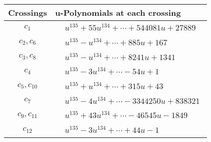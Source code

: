 \documentclass[1p]{elsarticle_modified}
\theoremstyle{definition}
\begin{document}
\begin{tabular}{m{50pt}|m{274pt}}
Crossings & \hspace{64pt}u-Polynomials at each crossing \\
\hline $$\begin{aligned}c_{1}\end{aligned}$$&$\begin{aligned}
&u^{135}+55 u^{134}+\cdots+544081 u+27889
\end{aligned}$\\
\hline $$\begin{aligned}c_{2},c_{6}\end{aligned}$$&$\begin{aligned}
&u^{135}- u^{134}+\cdots+885 u+167
\end{aligned}$\\
\hline $$\begin{aligned}c_{3},c_{8}\end{aligned}$$&$\begin{aligned}
&u^{135}- u^{134}+\cdots+8241 u+1341
\end{aligned}$\\
\hline $$\begin{aligned}c_{4}\end{aligned}$$&$\begin{aligned}
&u^{135}-3 u^{134}+\cdots-54 u+1
\end{aligned}$\\
\hline $$\begin{aligned}c_{5},c_{10}\end{aligned}$$&$\begin{aligned}
&u^{135}+u^{134}+\cdots+315 u+43
\end{aligned}$\\
\hline $$\begin{aligned}c_{7}\end{aligned}$$&$\begin{aligned}
&u^{135}-4 u^{134}+\cdots-3344250 u+838321
\end{aligned}$\\
\hline $$\begin{aligned}c_{9},c_{11}\end{aligned}$$&$\begin{aligned}
&u^{135}+43 u^{134}+\cdots-46545 u-1849
\end{aligned}$\\
\hline $$\begin{aligned}c_{12}\end{aligned}$$&$\begin{aligned}
&u^{135}-3 u^{134}+\cdots+44 u-1
\end{aligned}$\\
\hline
\end{tabular}\\~\\
\end{document}
